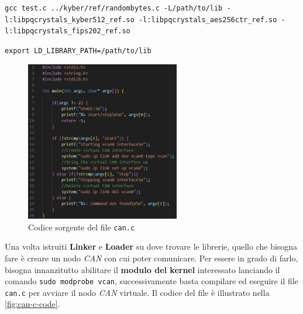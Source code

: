\begin{lstlisting}[keywords={gcc}, caption=Istruzioni per il Linker, label=lst:linker-info]
    gcc test.c ../kyber/ref/randombytes.c -L/path/to/lib -l:libpqcrystals_kyber512_ref.so -l:libpqcrystals_aes256ctr_ref.so -l:libpqcrystals_fips202_ref.so
\end{lstlisting}

\begin{lstlisting}[keywords={export}, caption=Istruzioni per il Loader, label=lst:loader-info]
    export LD_LIBRARY_PATH=/path/to/lib
\end{lstlisting}

\begin{figure}[h]
    \centering
    \includegraphics[width=0.6\textwidth]{capitoli/figure-implementazione/can.c.png}
    \caption{Codice sorgente del file \texttt{can.c}}
    \label{fig:can-c-code}
\end{figure}

Una volta istruiti \textbf{Linker} e \textbf{Loader} su dove trovare le librerie, quello che bisogna fare è creare un nodo \emph{CAN} con cui poter comunicare. Per essere in grado di farlo, bisogna innanzitutto abilitare il \textbf{modulo del kernel} interessato lanciando il comando \texttt{sudo modprobe vcan}, successivamente basta compilare ed eseguire il file \texttt{can.c} per avviare il nodo \emph{CAN} virtuale. Il codice del file è illustrato nella \autoref{fig:can-c-code}.


